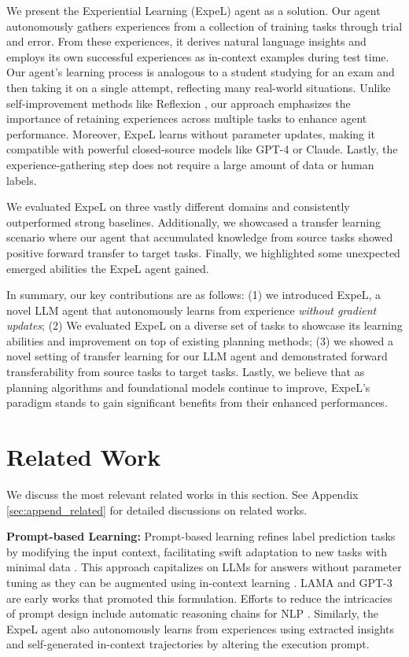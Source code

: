 \documentclass[letterpaper]{article} %
\begin{document}
We present the Experiential Learning (ExpeL) agent as a solution. Our agent autonomously gathers experiences from a collection of training tasks through trial and error. From these experiences, it derives natural language insights and employs its own successful experiences as in-context examples during test time. Our agent's learning process is analogous to a student studying for an exam and then taking it on a single attempt, reflecting many real-world situations. Unlike self-improvement methods like Reflexion \cite{shinn2023reflexion}, our approach emphasizes the importance of retaining experiences across multiple tasks to enhance agent performance. Moreover, ExpeL learns without parameter updates, making it compatible with powerful closed-source models like GPT-4 or Claude. Lastly, the experience-gathering step does not require a large amount of data or human labels.

We evaluated ExpeL on three vastly different domains and consistently outperformed strong baselines. Additionally, we showcased a transfer learning scenario where our agent that accumulated knowledge from source tasks showed positive forward transfer to target tasks. Finally, we highlighted some unexpected emerged abilities the ExpeL agent gained.

In summary, our key contributions are as follows: (1) we introduced ExpeL, a novel LLM agent that autonomously learns from experience  \textit{without gradient updates}; (2) We evaluated ExpeL on a diverse set of tasks to showcase its learning abilities and improvement on top of existing planning methods; (3) we showed a novel setting of transfer learning for our LLM agent and demonstrated forward transferability from source tasks to target tasks. Lastly, we believe that as planning algorithms and foundational models continue to improve, ExpeL's paradigm stands to gain significant benefits from their enhanced performances.

\section{Related Work}
We discuss the most relevant related works in this section. See Appendix \ref{sec:append_related} for detailed discussions on related works.

\textbf{Prompt-based Learning:} Prompt-based learning refines label prediction tasks by modifying the input context, facilitating swift adaptation to new tasks with minimal data \cite{liu2023pre}. This approach capitalizes on LLMs for answers without parameter tuning as they can be augmented using in-context learning \cite{brown2020language}. LAMA \cite{petroni2019language} and GPT-3 \cite{brown2020language} are early works that promoted this formulation. Efforts to reduce the intricacies of prompt design include automatic reasoning chains for NLP \cite{kojima2022large,zhang2022automatic}. Similarly, the ExpeL agent also autonomously learns from experiences using extracted insights and self-generated in-context trajectories by altering the execution prompt.
\end{document}
